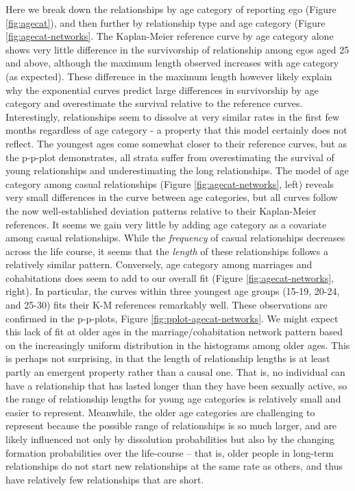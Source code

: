 \documentclass [11pt, proquest] {uwthesis}[2015/03/03]
\begin{document}
Here we break down the relationships by age category of reporting ego (Figure \ref{fig:agecat}), and then further by relationship type and age category (Figure \ref{fig:agecat-networks}. The Kaplan-Meier reference curve by age category alone shows very little difference in the survivorship of relationship among egos aged 25 and above, although the maximum length observed increases with age category (as expected). These difference in the maximum length however likely explain why the exponential curves predict large differences in survivorship by age category and overestimate the survival relative to the reference curves. Interestingly, relationships seem to dissolve at very similar rates in the first few months regardless of age category - a property that this model certainly does not reflect. The youngest ages come somewhat closer to their reference curves, but as the p-p-plot demonstrates, all strata suffer from overestimating the survival of young relationships and underestimating the long relationships.
The model of age category among casual relationships (Figure \ref{fig:agecat-networks}, left) reveals very small differences in the curve between age categories, but all curves follow the now well-established deviation patterns relative to their Kaplan-Meier references. It seems we gain very little by adding age category as a covariate among casual relationships. While the \emph{frequency} of casual relationships decreases across the life course, it seems that the \emph{length} of these relationships follows a relatively similar pattern. Conversely, age category among marriages and cohabitations does seem to add to our overall fit (Figure \ref{fig:agecat-networks}, right). In particular, the curves within three youngest age groups (15-19, 20-24, and 25-30) fits their K-M references remarkably well. These observations are confirmed in the p-p-plots, Figure \ref{fig:pplot-agecat-networks}. We might expect this lack of fit at older ages in the marriage/cohabitation network pattern based on the increasingly uniform distribution in the histograms among older ages. This is perhaps not surprising, in that the length of relationship lengths is at least partly an emergent property rather than a causal one. That is, no individual can have a relationship that has lasted longer than they have been sexually active, so the range of relationship lengths for young age categories is relatively small and easier to represent. Meanwhile, the older age categories are challenging to represent because the possible range of relationships is so much larger, and are likely influenced not only by dissolution probabilities but also by the changing formation probabilities over the life-course -- that is, older people in long-term relationships do not start new relationships at the same rate as others, and thus have relatively few relationships that are short.
\end{document}
